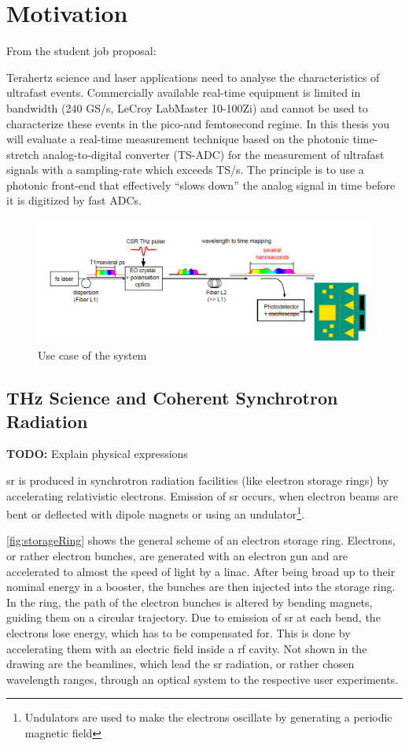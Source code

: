 \section{Motivation}

From the student job proposal:

Terahertz science and laser applications need to analyse the characteristics of ultrafast events. Commercially available real-time equipment is limited in bandwidth (240 GS/s, LeCroy LabMaster 10-100Zi) and cannot be used to characterize these events in the pico-and femtosecond regime. In this thesis you will evaluate a real-time measurement technique based on the photonic time-stretch analog-to-digital converter (TS-ADC) for the measurement of ultrafast signals with a sampling-rate which exceeds TS/s. The principle is to use a photonic front-end that effectively “slows down” the analog signal in time before it is digitized by fast ADCs.


\begin{figure}[tbh]
	\centering
	\includegraphics[width=\textwidth]{chap/02-theory/img/motivation}
	\caption{Use case of the system}
	\label{fig:motivation}
\end{figure}

\subsection{THz Science and Coherent Synchrotron Radiation}
\textbf{TODO:} Explain physical expressions

\Gls{sr} is produced in synchrotron radiation facilities (like electron storage rings) by accelerating relativistic electrons.
Emission of \gls{sr} occurs, when electron beams are bent or deflected with dipole magnets or using an undulator\footnote{Undulators are used to make the electrons oscillate by generating a periodic magnetic field}. 

\autoref{fig:storageRing} shows the general scheme of an electron storage ring.
Electrons, or rather electron bunches, are generated with an electron gun and are accelerated to almost the speed of light by a \gls{linac}.
After being broad up to their nominal energy in a booster, the bunches are then injected into the storage ring.
In the ring, the path of the electron bunches is altered by bending magnets, guiding them on a circular trajectory.
Due to emission of \gls{sr} at each bend, the electrons lose energy, which has to be compensated for.
This is done by accelerating them with an electric field inside a \gls{rf} cavity.
Not shown in the drawing are the beamlines, which lead the \gls{sr} radiation, or rather chosen wavelength ranges, through an optical system to the respective user experiments. \cite{roussel2014} \cite{rota2018}

